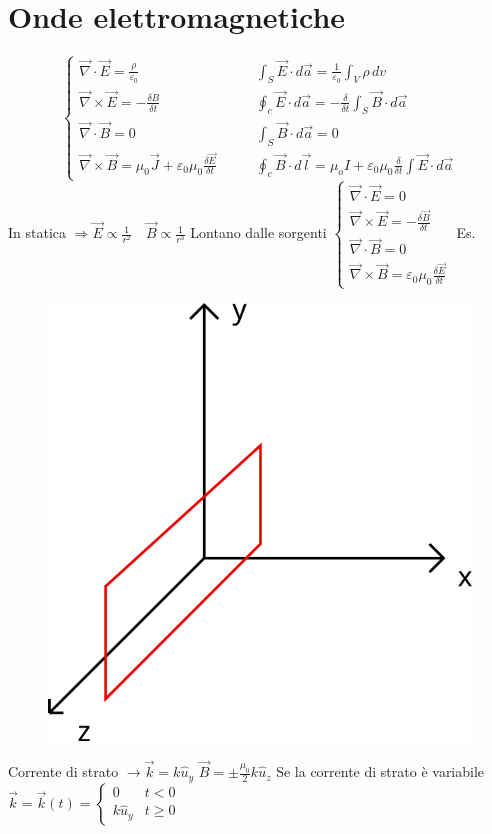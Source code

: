 \documentclass[a4paper,11pt]{report}
\newcommand{\A}{d\vec{a}}
\newcommand{\B}{\vec{B}}
\newcommand{\e}{\vec{E}}
\newcommand{\n}{\vec{\nabla}}
\begin{document}
\chapter{Onde elettromagnetiche}
\[\begin{cases}
	\vec{\nabla} \cdot \vec{E} = \frac{\rho}{\varepsilon_0}\qquad  & \int_{S} \vec{E}\cdot d\vec{a} = \frac{1}{\varepsilon_0} \int_V \rho \, dv \\
	\vec{\nabla} \times \vec{E} = - \frac{\delta B}{\delta t} \qquad & \oint_{c} \vec{E}\cdot d\vec{a} = - \frac{\delta}{\delta t} \int_S \vec{B} \cdot d\vec{a} \\
	\vec{\nabla}\cdot \vec{B} =0 \qquad & \int_S \B \cdot \A =0 \\
	\n \times \B = \mu_0\vec{J} + \varepsilon_0\mu_0 \frac{\delta\e}{\delta t} \qquad & \oint_{c} \B \cdot d\vec{l} = \mu_oI + \varepsilon_0\mu_0 \frac{\delta}{\delta t} \int \e\cdot \A
\end{cases}\]
In statica $\Rightarrow \e \propto \frac{1}{r^2} \quad \B \propto \frac{1}{r^3}$ \newline
Lontano dalle sorgenti 
$\begin{cases}
	\n\cdot \e =0 \\
	\n\times\e = -\frac{\delta\B}{\delta t}\\
	\n\cdot\B =0\\
	\n\times\B = \varepsilon_0\mu_0\frac{\delta\e}{\delta t}
\end{cases}$
\newline Es.
\begin{figure}[H]
	\centering
	\includegraphics[width=0.4\linewidth,keepaspectratio]{immagini/disegno1}
	\label{fig:disegno1}
\end{figure}
\noindent Corrente di strato $\rightarrow \vec{k} = k\hat{u}_y$ \newline
$\B = \pm {\frac{\mu_0}{2}} k \hat{u}_z $ \newline
Se la corrente di strato è variabile 
$\vec{k} = \vec{k}(t) =\begin{cases}
	0 & t<0 \\
	k\hat{u}_y & t \geq 0
\end{cases}$ \newline
\end{document}
